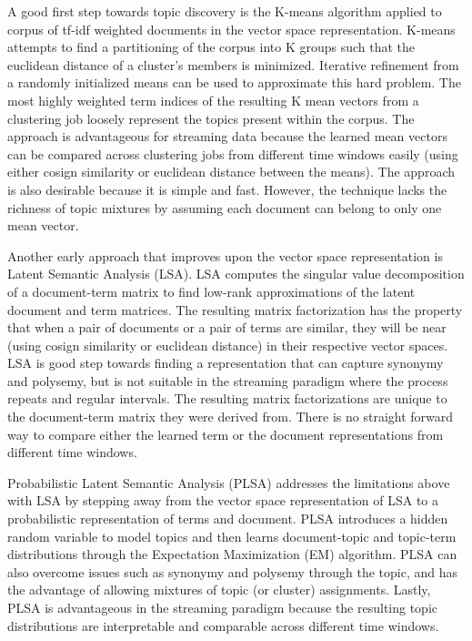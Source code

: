 \documentclass[10pt,twocolumn]{article}
\begin{document}
A good first step towards topic discovery is the K-means algorithm applied to corpus of tf-idf weighted documents in the vector space representation.  K-means attempts to find a partitioning of the corpus into K groups such that the euclidean distance of a cluster's members is minimized.  Iterative refinement from a randomly initialized means can be used to approximate this hard problem.  The most highly weighted term indices of the resulting K mean vectors from a clustering job loosely represent the topics present within the corpus.  The approach is advantageous for streaming data because the learned mean vectors can be compared across clustering jobs from different time windows easily (using either cosign similarity or euclidean distance between the means).  The approach is also desirable because it is simple and fast.  However, the technique lacks the richness of topic mixtures by assuming each document can belong to only one mean vector. 

Another early approach that improves upon the vector space representation is Latent Semantic Analysis (LSA).  LSA computes the singular value decomposition of a document-term matrix to find low-rank approximations of the latent document and term matrices.  The resulting matrix factorization has the property that when a pair of documents or a pair of terms are similar, they will be near (using cosign similarity or euclidean distance) in their respective vector spaces.  LSA is good step towards finding a representation that can capture synonymy and polysemy, but is not suitable in the streaming paradigm where the process repeats and regular intervals.  The resulting matrix factorizations are unique to the document-term matrix they were derived from.  There is no straight forward way to compare either the learned term or the document representations from different time windows.

Probabilistic Latent Semantic Analysis (PLSA) addresses the limitations above with LSA by stepping away from the vector space representation of LSA to a probabilistic representation of terms and document.  PLSA introduces a hidden random variable to model topics and then learns document-topic and topic-term distributions through the Expectation Maximization (EM) algorithm.  PLSA can also overcome issues such as synonymy and polysemy through the topic, and has the advantage of allowing mixtures of topic (or cluster) assignments.  Lastly, PLSA is advantageous in the streaming paradigm because the resulting topic distributions are interpretable and comparable across different time windows. 
\end{document}
